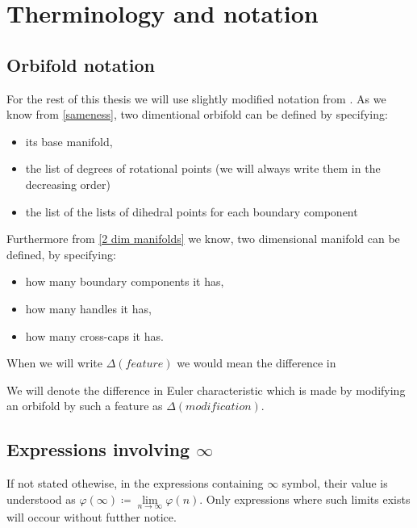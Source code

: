\section{Therminology and notation}\label{therminology and notation}
\subsection{Orbifold notation}
For the rest of this thesis we will use slightly modified notation from \cite{Conway2016}.
As we know from \ref{sameness}, two dimentional orbifold can be defined 
by specifying:
\begin{itemize} 
\item its base manifold, 
\item the list of degrees of rotational points (we will 
always write them in the decreasing order) 
\item the list of the lists of dihedral points for each boundary component
\end{itemize}
Furthermore from \ref{2 dim manifolds} we know, two dimensional manifold 
can be 
defined, by specifying:
\begin{itemize}
\item how many boundary components it has,
\item how many handles it has,
\item how many cross-caps it has.
\end{itemize} 

When we will write $\Delta(feature)$ we would mean the difference in \Eoc

We will denote the difference in Euler characteristic which is made by modifying 
an orbifold by such a feature as $\Delta(modification)$.

\subsection{Expressions involving $\infty$}
If not stated othewise, in the expressions containing $\infty$ symbol, their value is understood 
as $\varphi(\infty) \coloneqq \lim\limits_{n\to \infty}\varphi(n)$. Only expressions 
where such limits exists will occour without futther notice.

